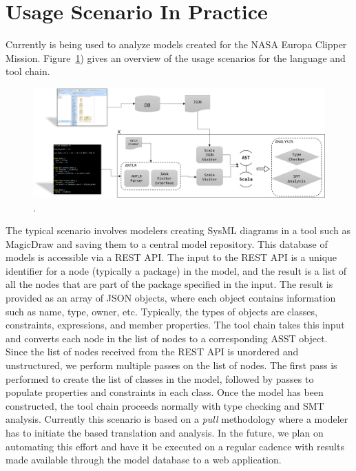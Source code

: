 \section{Usage Scenario In Practice}

Currently \Klang{} is being used to analyze models created for the
NASA Europa Clipper Mission. Figure~\ref{fig:k}) gives an overview of
the usage scenarios for the \Klang{} language and tool chain.

\begin{figure}
\centering
\includegraphics[scale=0.39]{K.png}
\caption{\Klang{}.}
\label{fig:k}
\end{figure}

The typical scenario involves modelers creating SysML diagrams in a
tool such as MagicDraw and saving them to a central model
repository. This database of models is accessible via a REST API. The
input to the REST API is a unique identifier for a node (typically a
\sysml{} package) in the model, and the result is a list of all the
nodes that are part of the package specified in the input. The result
is provided as an array of JSON objects, where each object contains
information such as name, type, owner, etc. Typically, the types of
objects are classes, constraints, expressions, and member
properties. The \Klang{} tool chain takes this input and converts each
node in the list of nodes to a corresponding \Klang{} ASST
object. Since the list of nodes received from the REST API is
unordered and unstructured, we perform multiple passes on
the list of nodes. The first pass is performed to create the list of
classes in the model, followed by passes to populate properties and
constraints in each class. Once the \Klang{} model has been
constructed, the \Klang{} tool chain proceeds normally with type
checking and SMT analysis. Currently this scenario is based on a {\em
  pull} methodology where a modeler has to initiate the \Klang{} based
translation and analysis. In the future, we plan on automating this
effort and have it be executed on a regular cadence with results made
available through the model database to a web application.

